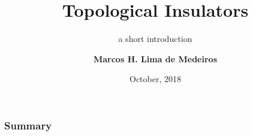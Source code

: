 \documentclass[usenames, dvipsnames]{beamer}
\title[introduction to topological insulators] %
{Topological Insulators}
\subtitle{a short introduction}
\author[My name]{\textbf {Marcos H. Lima de Medeiros}}
\institute[VFU] %
{
  Instituto de Física\\
  Universidade de São Paulo
}
\date[VLC 2013] %
{October, 2018}
\begin{document}
\frame{\titlepage}

\begin{frame}
 \frametitle{Summary}
 \tableofcontents[pausesections]
\end{frame}



\end{document}
